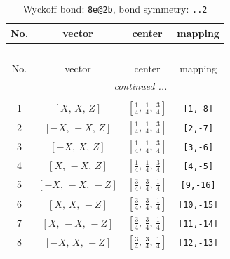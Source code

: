 \documentclass[fleqn,8pt]{jsarticle}
\begin{document}
\begin{longtable}{cccc}
\caption{Wyckoff bond: {\tt 8e@2b}, bond symmetry: {\tt ..2}}
 \\
 \hline \hline
No. & vector & center & mapping \\ \hline \endfirsthead

\multicolumn{3}{l}{\tablename\ \thetable{}} \\
 \hline \hline
No. & vector & center & mapping \\ \hline \endhead

 \hline \hline
\multicolumn{3}{r}{\footnotesize\it continued ...} \\ \endfoot

 \hline \hline
\multicolumn{3}{r}{} \\ \endlastfoot

1 & $\left[ X,\, X,\, Z \right]$ & $\left[ \frac{1}{4},\, \frac{1}{4},\, \frac{3}{4} \right]$ & {\tt [1,-8]} \\ \hline
2 & $\left[ - X,\, - X,\, Z \right]$ & $\left[ \frac{1}{4},\, \frac{1}{4},\, \frac{3}{4} \right]$ & {\tt [2,-7]} \\ \hline
3 & $\left[ - X,\, X,\, Z \right]$ & $\left[ \frac{1}{4},\, \frac{1}{4},\, \frac{3}{4} \right]$ & {\tt [3,-6]} \\ \hline
4 & $\left[ X,\, - X,\, Z \right]$ & $\left[ \frac{1}{4},\, \frac{1}{4},\, \frac{3}{4} \right]$ & {\tt [4,-5]} \\ \hline
5 & $\left[ - X,\, - X,\, - Z \right]$ & $\left[ \frac{3}{4},\, \frac{3}{4},\, \frac{1}{4} \right]$ & {\tt [9,-16]} \\ \hline
6 & $\left[ X,\, X,\, - Z \right]$ & $\left[ \frac{3}{4},\, \frac{3}{4},\, \frac{1}{4} \right]$ & {\tt [10,-15]} \\ \hline
7 & $\left[ X,\, - X,\, - Z \right]$ & $\left[ \frac{3}{4},\, \frac{3}{4},\, \frac{1}{4} \right]$ & {\tt [11,-14]} \\ \hline
8 & $\left[ - X,\, X,\, - Z \right]$ & $\left[ \frac{3}{4},\, \frac{3}{4},\, \frac{1}{4} \right]$ & {\tt [12,-13]} \\
\end{longtable}
\renewcommand{\arraystretch}{1.2}
\end{document}
